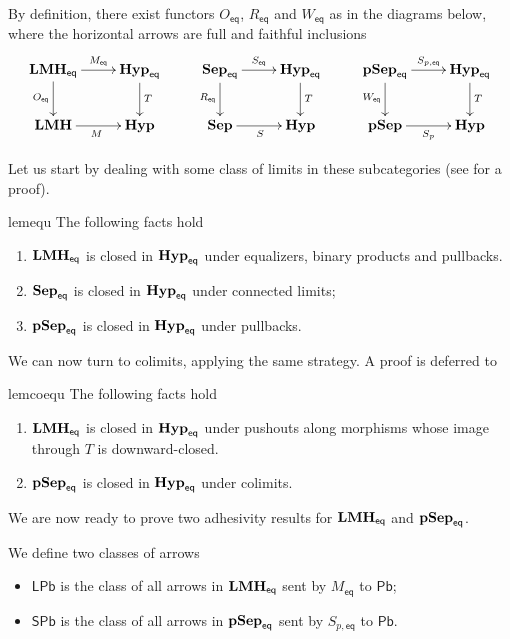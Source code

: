\documentclass[3p]{elsarticle}
\newcommand{\pbc}{\mathsf{Pb}}
\newcommand{\pbl}{\mathsf{LPb}}
\newcommand{\pbs}{\mathsf{SPb}}
\newcommand{\eq}{\mathsf{eq}}
\newcommand{\catname}[1]{\textbf{\textup{#1}}}
\newcommand{\lmo}{\catname{LMH}}
\newcommand{\hyp}{\catname{Hyp}}
\newcommand{\pshyp}{\catname{pSep}}
\newcommand{\shyp}{\catname{Sep}}
\newcommand{\EqHyp}{\catname{Hyp}_{\mathsf{eq}}} %
\newcommand{\EqsHyp}{\catname{Sep}_{\mathsf{eq}}}
\newcommand{\EqpsHyp}{\catname{pSep}_{\mathsf{eq}}}
\newcommand{\Eqlmo}{\catname{LMH}_{\mathsf{eq}}}
\theoremstyle{remark}
\theoremstyle{definition}
\begin{document}
\begin{rem}\label{rem:obv1}
By definition, there exist functors $O_{\eq}$, $R_{\eq}$ and $W_{\eq}$ as in the diagrams below, where the horizontal arrows are full and faithful inclusions
\[\xymatrix{\Eqlmo \ar[r]^-{M_{\mathsf{eq}}} \ar[d]_{O_{\mathsf{eq}}}& \EqHyp\ar[d]^{T} & \EqsHyp \ar[r]^-{S_{\mathsf{eq}}} \ar[d]_{R_{\mathsf{eq}}} & \EqHyp \ar[d]^{T} & \EqpsHyp \ar[r]^-{S_{p, \mathsf{eq}}} \ar[d]_{W_{\mathsf{eq}}} & \EqHyp\ar[d]^{T}\\ \lmo \ar[r]_{M} & \hyp & \shyp \ar[r]_{S} & \hyp  & \pshyp \ar[r]_-{S_p}& \hyp}\]
	
\end{rem}

Let us start by dealing with some class of limits in these subcategories (see  for a proof).

\begin{restatable}{lem}{equ}\label{lem:equ} The following facts hold
	\begin{enumerate}
		\item 	$\Eqlmo$ is closed in $\EqHyp$ under equalizers, binary products and pullbacks.
		\item $\EqsHyp$ is closed in $\EqHyp$ under connected limits; 
		\item $\EqpsHyp$ is closed in $\EqHyp$ under pullbacks.
	\end{enumerate}
\end{restatable}

We can now turn to colimits, applying the same strategy. A proof is deferred to 

\begin{restatable}{lem}{coequ}\label{lem:coequ}
 The following facts hold
\begin{enumerate}
	\item 	$\Eqlmo$ is closed in $\EqHyp$ under pushouts along morphisms whose image through $T$ is downward-closed.
	\item $\EqpsHyp$ is closed in $\EqHyp$ under colimits.
\end{enumerate}
\end{restatable}

We are now ready to prove two adhesivity results for $\Eqlmo$ and $\EqpsHyp$.

\begin{defi}We define two classes of arrows
\begin{itemize}
	\item $\pbl$ is the class of all arrows in $\Eqlmo$ sent by $M_{\eq}$ to $\pbc$;
	\item $\pbs$ is the class of all arrows in $\EqpsHyp$ sent by $S_{p,\eq}$ to $\pbc$.
\end{itemize}
\end{defi}
\end{document}
